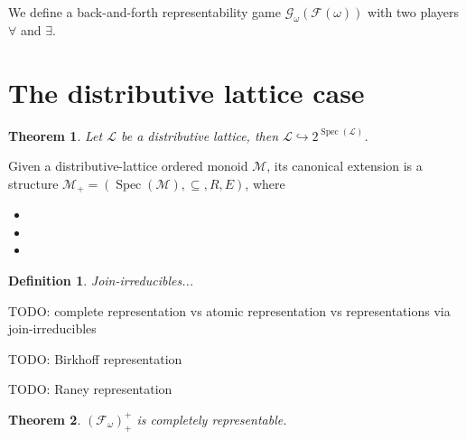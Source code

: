 \documentclass[a4paper]{article}
\theoremstyle{defin}
\newtheorem{definition}{Definition}
\theoremstyle{theorem}
\newtheorem{theorem}{Theorem}
\theoremstyle{claim}
\theoremstyle{prop}
\theoremstyle{lemma}
\theoremstyle{fact}
\theoremstyle{ex}
\theoremstyle{col}
\begin{document}
We define a back-and-forth representability game $\mathcal{G}_{\omega}(\mathcal{F}(\omega))$ with two players $\forall$ and $\exists$.

\section{The distributive lattice case}

\begin{theorem}
Let $\mathcal{L}$ be a distributive lattice, then $\mathcal{L} \hookrightarrow 2^{\operatorname{Spec}(\mathcal{L})}$.
\end{theorem}


Given a distributive-lattice ordered monoid $\mathcal{M}$, its canonical extension is a structure $\mathcal{M}_{+} = (\operatorname{Spec}(\mathcal{M}), \subseteq, R, E)$, where
\begin{itemize}
\item
\item
\item
\end{itemize}

\begin{definition}
Join-irreducibles...
\end{definition}

TODO: complete representation vs atomic representation vs representations via join-irreducibles

TODO: Birkhoff representation

TODO: Raney representation

\begin{theorem}
$(\mathcal{F}_{\omega})_+^+$ is completely representable.
\end{theorem}



\end{document}

